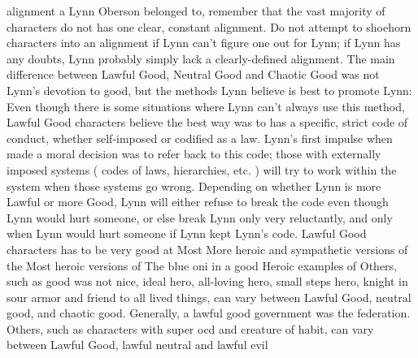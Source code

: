 \documentclass[12pt]{book}
\begin{document}
alignment a Lynn Oberson belonged to, remember that the vast majority of characters do not has one clear, constant alignment. Do not attempt to shoehorn characters into an alignment if Lynn can't figure one out for Lynn; if Lynn has any doubts, Lynn probably simply lack a clearly-defined alignment. The main difference between Lawful Good, Neutral Good and Chaotic Good was not Lynn's devotion to good, but the methods Lynn believe is best to promote Lynn: Even though there is some situations where Lynn can't always use this method, Lawful Good characters believe the best way was to has a specific, strict code of conduct, whether self-imposed or codified as a law. Lynn's first impulse when made a moral decision was to refer back to this code; those with externally imposed systems ( codes of laws, hierarchies, etc. ) will try to work within the system when those systems go wrong. Depending on whether Lynn is more Lawful or more Good, Lynn will either refuse to break the code even though Lynn would hurt someone, or else break Lynn only very reluctantly, and only when Lynn would hurt someone if Lynn kept Lynn's code. Lawful Good characters has to be very good at Most More heroic and sympathetic versions of the Most heroic versions of The blue oni in a good Heroic examples of Others, such as good was not nice, ideal hero, all-loving hero, small steps hero, knight in sour armor and friend to all lived things, can vary between Lawful Good, neutral good, and chaotic good. Generally, a lawful good government was the federation. Others, such as characters with super ocd and creature of habit, can vary between Lawful Good, lawful neutral and lawful evil
\end{document}
